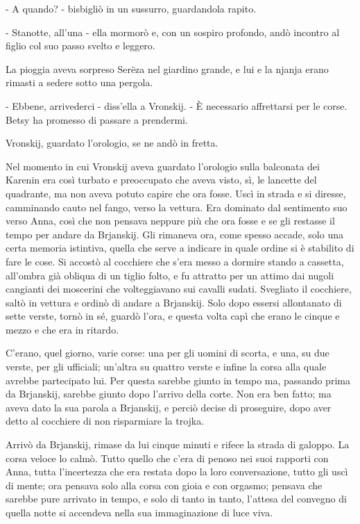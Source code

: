 - A quando? - bisbigliò in un sussurro, guardandola rapito. 

- Stanotte, all'una - ella mormorò e, con un sospiro profondo, andò incontro al figlio col suo passo svelto e leggero. 

La pioggia aveva sorpreso Serëza nel giardino grande, e lui e la njanja erano rimasti a sedere sotto una pergola. 

- Ebbene, arrivederci - diss'ella a Vronskij. - È necessario affrettarsi per le corse. Betsy ha promesso di passare a prendermi. 

Vronskij, guardato l'orologio, se ne andò in fretta. 
\enlargethispage*{1\baselineskip}

\label{xxiv-1} 

Nel momento in cui Vronskij aveva guardato l'orologio sulla balconata dei Karenin era così turbato e preoccupato che aveva visto, sì, le lancette del quadrante, ma non aveva potuto capire che ora fosse. Uscì in strada e si diresse, camminando cauto nel fango, verso la vettura. Era dominato dal sentimento suo verso Anna, così che non pensava neppure più che ora fosse e se gli restasse il tempo per andare da Brjanskij. Gli rimaneva ora, come spesso accade, solo una certa memoria istintiva, quella che serve a indicare in quale ordine si è stabilito di fare le cose. Si accostò al cocchiere che s'era messo a dormire stando a cassetta, all'ombra già obliqua di un tiglio folto, e fu attratto per un attimo dai nugoli cangianti dei moscerini che volteggiavano sui cavalli sudati. Svegliato il cocchiere, saltò in vettura e ordinò di andare a Brjanskij. Solo dopo essersi allontanato di sette verste, tornò in sé, guardò l'ora, e questa volta capì che erano le cinque e mezzo e che era in ritardo. 

C'erano, quel giorno, varie corse: una per gli uomini di scorta, e una, su due verste, per gli ufficiali; un'altra su quattro verste e infine la corsa alla quale avrebbe partecipato lui. Per questa sarebbe giunto in tempo ma, passando prima da Brjanskij, sarebbe giunto dopo l'arrivo della corte. Non era ben fatto; ma aveva dato la sua parola a Brjanskij, e perciò decise di proseguire, dopo aver detto al cocchiere di non risparmiare la trojka. 

Arrivò da Brjanskij, rimase da lui cinque minuti e rifece la strada di galoppo. La corsa veloce lo calmò. Tutto quello che c'era di penoso nei suoi rapporti con Anna, tutta l'incertezza che era restata dopo la loro conversazione, tutto gli uscì di mente; ora pensava solo alla corsa con gioia e con orgasmo; pensava che sarebbe pure arrivato in tempo, e solo di tanto in tanto, l'attesa del convegno di quella notte si accendeva nella sua immaginazione di luce viva. 

